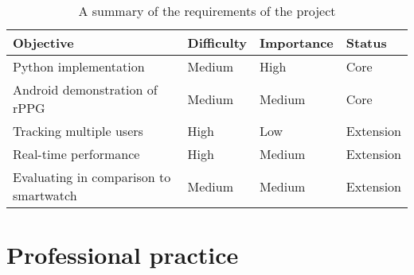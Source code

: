 \begin{table}[H]
    \begin{tabular}{|l|l|l|l|}
    \hline
    \textbf{Objective} & \textbf{Difficulty} & \textbf{Importance} & \textbf{Status} \\ \hline
    Python implementation & {\color[HTML]{F56B00} Medium} & {\color[HTML]{CB0000} High} & {\color[HTML]{CB0000} Core} \\ \hline
    Android demonstration of rPPG & {\color[HTML]{F56B00} Medium} & {\color[HTML]{F56B00} Medium} & {\color[HTML]{CB0000} Core} \\ \hline
    Tracking multiple users & {\color[HTML]{CB0000} High} & {\color[HTML]{009901} Low} & {\color[HTML]{009901} Extension} \\ \hline
    Real-time performance & {\color[HTML]{CB0000} High} & {\color[HTML]{F56B00} Medium} & {\color[HTML]{009901} Extension} \\ \hline
    Evaluating in comparison to smartwatch & {\color[HTML]{F56B00} Medium} & {\color[HTML]{F56B00} Medium} & {\color[HTML]{009901} Extension} \\ \hline
    \end{tabular}
    \caption{A summary of the requirements of the project}
\end{table}



\section{Professional practice}
